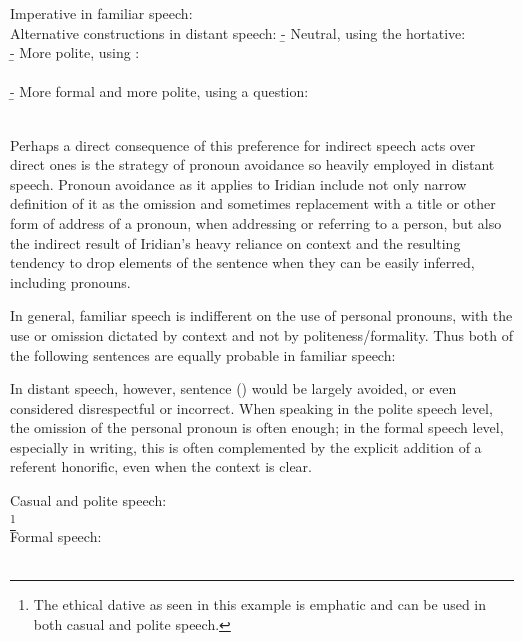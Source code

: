 \pex
\a Imperative in familiar speech:\\
 
\a Alternative constructions in distant speech:
\beginsubsub
  \b{-} {Neutral, using the hortative:\\
  	 }
  \b{-} {More polite, using :\\
  	\\}
  \b{-} {More formal and more polite, using a question:\\
  	\\
  	}
\endsubsub
\xe

Perhaps a direct consequence of this preference for indirect speech acts over direct ones is the strategy of {\sc pronoun avoidance} so heavily employed in distant speech. Pronoun avoidance as it applies to Iridian include not only  narrow definition of it as the omission and sometimes replacement with a title or other form of address of a pronoun, when addressing or referring to a person, but also the indirect result of Iridian's heavy reliance on context and the resulting tendency to drop elements of the sentence when they can be easily inferred, including pronouns.

In general, familiar speech is indifferent on the use of personal pronouns, with the use or omission dictated by context and not by politeness/formality. Thus both of the following sentences are equally probable in familiar speech:

\pex\a {} 
	\a {} 
\xe

In distant speech, however, sentence () would be largely avoided, or even considered disrespectful or incorrect. When speaking in the polite speech level, the omission of the personal pronoun is often enough; in the formal speech level, especially in writing, this is often complemented by the explicit addition of a referent honorific, even when the context is clear.

\pex
	\a Casual and polite speech:\\
		\footnote{
			The ethical dative as seen in this example is emphatic and can be used in both casual and polite speech.
		}\\
	\a Formal speech:\\
		\\
\xe

